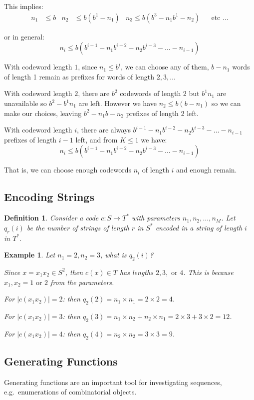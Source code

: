 \documentclass[11pt]{article}
\newtheorem{defn}{Definition}
\newtheorem{eg}{Example}
\begin{document}
This implies:
\begin{align*}
  n_1 &\leq b & n_2 &\leq b(b^1 - n_1) & n_3 \leq b(b^3 - n_1b^1 - n_2) & &\text{etc \ldots}
\end{align*}

or in general:
\[ n_i \leq b(b^{i - 1} - n_1b^{i - 2} - n_2b^{i - 3} - \ldots - n_{i - 1}) \]

With codeword length $1$, since $n_1 \leq b^i$, we can choose any of them, $b - n_1$ words of length 1 remain as prefixes for words of length $2, 3, \ldots$

With codeword length $2$, there are $b^2$ codewords of length 2 but $b^1n_1$ are unavailable so $b^2 - b^1n_1$ are left.
However we have $n_2 \leq b(b - n_1)$ so we can make our choices, leaving $b^2 - n_1b - n_2$ prefixes of length 2 left.

With codeword length $i$, there are always $b^{i - 1} - n_1b^{i - 2} - n_2b^{i-3} - \ldots - n_{i - 1}$ prefixes of length $i - 1$ left, and from $K \leq 1$ we have:
\[ n_i \leq b(b^{i - 1} - n_1b^{i - 2} - n_2b^{i - 3} - \ldots - n_{i - 1}) \]

That is, we can choose enough codewords $n_i$ of length $i$ and enough remain.

\subsection{Encoding Strings}
\begin{defn}
  Consider a code $c : S \rightarrow T^*$ with parameters $n_1, n_2, \ldots, n_M$.
  Let $q_r(i)$ be the number of strings of length $r$ in $S^*$ encoded in a string of length $i$ in $T^*$.
\end{defn}

\begin{eg}
  Let $n_1 = 2, n_2 = 3$, what is $q_2(i)$?

  Since $x = x_1x_2 \in S^2$, then $c(x) \in T$ has lengths $2, 3, \text{ or } 4$.
  This is because $x_1, x_2 = 1 \text{ or } 2$ from the parameters.

  For $\lvert c(x_1x_2) \rvert = 2$: then $q_2(2) = n_1 \times n_1 = 2 \times 2 = 4$.

  For $\lvert c(x_1x_2) \rvert = 3$: then $q_2(3) = n_1 \times n_2 + n_2 \times n_1 = 2 \times 3 + 3 \times 2 = 12$.

  For $\lvert c(x_1x_2) \rvert = 4$: then $q_2(4) = n_2 \times n_2 = 3 \times 3 = 9$.
\end{eg}

\subsection{Generating Functions}
Generating functions are an important tool for investigating sequences, e.g.\ enumerations of combinatorial objects.
\end{document}

